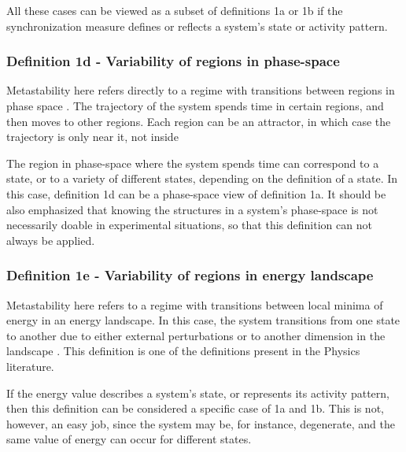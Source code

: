 \documentclass[preprint,superscriptaddress,showpacs,amsmath,amssymb,aps,pre,floatfix]{revtex4-1}
\theoremstyle{definition}
\begin{document}
All these cases can be viewed as a subset of definitions 1a or 1b if the synchronization measure defines or reflects a system's state or activity pattern. 


\subsubsection{Definition 1d - Variability of regions in phase-space}
\label{sec:varphasespace}
Metastability here refers directly to a regime with transitions between regions in phase space \cite{hudson_2017,  beimgraben_2019}. The trajectory of the system spends time in certain regions, and then moves to other regions.
Each region can be an attractor, in which case the trajectory is only near it, not inside \cite{hudson_2017}

The region in phase-space where the system spends time can correspond to a state, or to a variety of different states, depending on the definition of a state. In this case, definition 1d can be a phase-space view of definition 1a. It should be also emphasized that knowing the structures in a system's phase-space is not necessarily doable in experimental situations, so that this definition can not always be applied.


\subsubsection{Definition 1e - Variability of regions in energy landscape}
\label{sec:varenergy}
Metastability here refers to a regime with transitions between local minima of energy in an energy landscape. In this case, the system transitions from one state to another due to either external perturbations or to another dimension in the landscape \cite{gili_2018, cavanna_2018, aguilera_2016}. This definition is one of the definitions present in the Physics literature.

If the energy value describes a system's state, or represents its activity pattern, then this definition can be considered a specific case of 1a and 1b. This is not, however, an easy job, since the system may be, for instance, degenerate, and the same value of energy can occur for different states.

\end{document}
